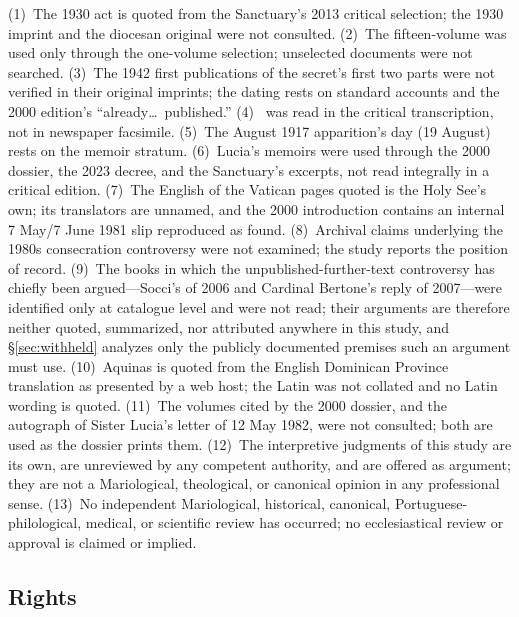 (1)~The 1930 act is quoted from the Sanctuary's 2013 critical
selection; the 1930 imprint and the diocesan original were not
consulted. (2)~The fifteen-volume 
was used only through the one-volume selection; unselected documents
were not searched. (3)~The 1942 first publications of the secret's
first two parts were not verified in their original imprints; the
dating rests on standard accounts and the 2000 edition's
``already\ldots\ published.'' (4)~ was read in the
critical transcription, not in newspaper facsimile. (5)~The August
1917 apparition's day (19 August) rests on the memoir stratum.
(6)~Lucia's memoirs were used through the 2000 dossier, the 2023
decree, and the Sanctuary's excerpts, not read integrally in a
critical edition. (7)~The English of the Vatican pages quoted is the
Holy See's own; its translators are unnamed, and the 2000
introduction contains an internal 7 May/7 June 1981 slip reproduced
as found. (8)~Archival claims underlying the 1980s consecration
controversy were not examined; the study reports the position of
record. (9)~The books in which the unpublished-further-text
controversy has chiefly been argued---Socci's of 2006 and Cardinal
Bertone's reply of 2007---were identified only at catalogue level and
were not read; their arguments are therefore neither quoted,
summarized, nor attributed anywhere in this study, and
\S\ref{sec:withheld} analyzes only the publicly documented premises
such an argument must use. (10)~Aquinas is quoted from the English
Dominican Province translation as presented by a web host; the Latin
was not collated and no Latin wording is quoted. (11)~The
 volumes cited by the 2000 dossier, and the
autograph of Sister Lucia's letter of 12 May 1982, were not
consulted; both are used as the dossier prints them. (12)~The
interpretive judgments of this study are its own, are unreviewed by
any competent authority, and are offered as argument; they are not a
Mariological, theological, or canonical opinion in any professional
sense. (13)~No independent Mariological, historical, canonical,
Portuguese-philological, medical, or scientific review has occurred;
no ecclesiastical review or approval is claimed or implied.

\subsection*{Rights}

